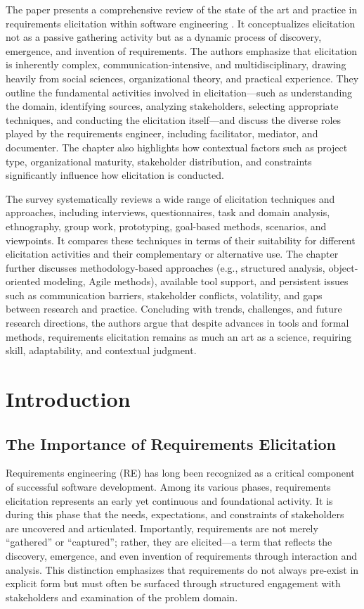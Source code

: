 The paper presents a comprehensive review of the state of the art and practice in requirements elicitation within software engineering . It conceptualizes elicitation not as a passive gathering activity but as a dynamic process of discovery, emergence, and invention of requirements. The authors emphasize that elicitation is inherently complex, communication-intensive, and multidisciplinary, drawing heavily from social sciences, organizational theory, and practical experience. They outline the fundamental activities involved in elicitation—such as understanding the domain, identifying sources, analyzing stakeholders, selecting appropriate techniques, and conducting the elicitation itself—and discuss the diverse roles played by the requirements engineer, including facilitator, mediator, and documenter. The chapter also highlights how contextual factors such as project type, organizational maturity, stakeholder distribution, and constraints significantly influence how elicitation is conducted.

The survey systematically reviews a wide range of elicitation techniques and approaches, including interviews, questionnaires, task and domain analysis, ethnography, group work, prototyping, goal-based methods, scenarios, and viewpoints. It compares these techniques in terms of their suitability for different elicitation activities and their complementary or alternative use. The chapter further discusses methodology-based approaches (e.g., structured analysis, object-oriented modeling, Agile methods), available tool support, and persistent issues such as communication barriers, stakeholder conflicts, volatility, and gaps between research and practice. Concluding with trends, challenges, and future research directions, the authors argue that despite advances in tools and formal methods, requirements elicitation remains as much an art as a science, requiring skill, adaptability, and contextual judgment.

\section{Introduction}
\subsection{The Importance of Requirements Elicitation}

Requirements engineering (RE) has long been recognized as a critical component of successful software development. Among its various phases, requirements elicitation represents an early yet continuous and foundational activity. It is during this phase that the needs, expectations, and constraints of stakeholders are uncovered and articulated. Importantly, requirements are not merely “gathered” or “captured”; rather, they are elicited—a term that reflects the discovery, emergence, and even invention of requirements through interaction and analysis. This distinction emphasizes that requirements do not always pre-exist in explicit form but must often be surfaced through structured engagement with stakeholders and examination of the problem domain.

